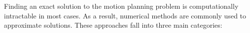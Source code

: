 




Finding an exact solution to the motion planning problem is computationally intractable in most cases.
As a result, numerical methods are commonly used to approximate solutions.
These approaches fall into three main categories:

